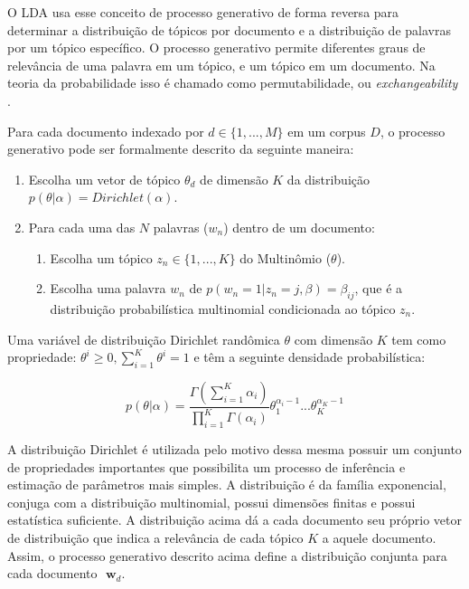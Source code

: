 \documentclass[12pt,a4paper]{article}
\begin{document}
 O LDA usa esse conceito de processo generativo de forma reversa para determinar a distribuição de tópicos por documento e a distribuição de palavras por um tópico específico. 
 O processo generativo permite diferentes graus de relevância de uma palavra em um tópico, e um tópico em um documento. Na teoria da probabilidade isso é chamado como permutabilidade,
 ou \textit{exchangeability} \cite{aldous1985exchangeability}. 
 
 Para cada documento indexado por $d \in \{1,. . . , M\}$ em um corpus $D$, o processo generativo pode ser formalmente descrito da seguinte maneira:


\begin{enumerate}
  \item Escolha um vetor de tópico $\theta _d$ de dimensão $K$ da distribuição $p(\theta|\alpha)=Dirichlet(\alpha)$.
  \item Para cada uma das $N$ palavras ($w_n$) dentro de um documento:
  \begin{enumerate}
  	\item Escolha um tópico \(z_n \in \{1,. . . , K\}\) do Multinômio ($\theta$).
    \item Escolha uma palavra $w_n$ de \(p(w_n=1| z_n=j,\beta)=\beta _{ij}\), que é a distribuição probabilística multinomial condicionada ao tópico $z_n$.
  \end{enumerate}
\end{enumerate}


Uma variável de distribuição Dirichlet randômica $\theta$ com dimensão $K$ tem como propriedade: $\theta ^i \geq 0, \displaystyle\sum_{i=1}^{K} \theta ^i = 1$ e têm a seguinte densidade probabilística:

\begin{equation}
p(\theta|\alpha) = \frac{\Gamma(\displaystyle\sum_{i=1}^{K} \alpha _i)}{\displaystyle\prod_{i=1}^{K} \Gamma(\alpha _i)} \theta _1 ^{\alpha _i - 1} ...  \theta _K ^{\alpha _K - 1}
\end{equation}

A distribuição Dirichlet é utilizada pelo motivo dessa mesma possuir um conjunto de propriedades importantes que possibilita um processo de inferência e estimação de parâmetros mais simples.
 A distribuição é da família exponencial, conjuga com a distribuição multinomial, possui dimensões finitas e possui estatística suficiente.
 A distribuição  acima dá a cada documento seu próprio vetor de distribuição que indica a relevância de cada tópico $K$ a aquele documento.
 Assim, o processo generativo descrito acima define a distribuição conjunta para cada documento $\textbf{ w}_d$.
\end{document}
